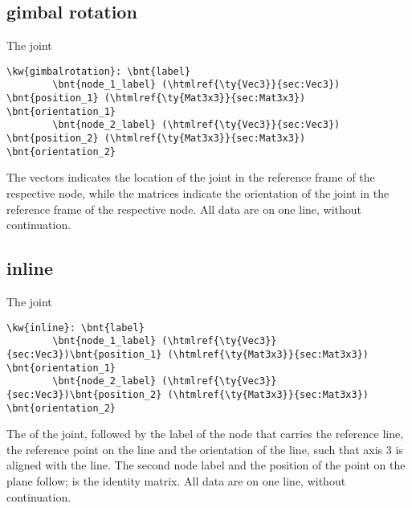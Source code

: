 \subsection{gimbal rotation}
The  joint
\begin{Verbatim}[commandchars=\\\{\}]
    \kw{gimbalrotation}: \bnt{label}
        \bnt{node_1_label} (\htmlref{\ty{Vec3}}{sec:Vec3}) \bnt{position_1} (\htmlref{\ty{Mat3x3}}{sec:Mat3x3}) \bnt{orientation_1}
        \bnt{node_2_label} (\htmlref{\ty{Vec3}}{sec:Vec3}) \bnt{position_2} (\htmlref{\ty{Mat3x3}}{sec:Mat3x3}) \bnt{orientation_2}
\end{Verbatim}
The  vectors indicates the location of the joint
in the reference frame of the respective node,
while the  matrices indicate the orientation of the joint
in the reference frame of the respective node.
All data are on one line, without continuation.

\subsection{inline}
The  joint
\begin{Verbatim}[commandchars=\\\{\}]
    \kw{inline}: \bnt{label}
        \bnt{node_1_label} (\htmlref{\ty{Vec3}}{sec:Vec3})\bnt{position_1} (\htmlref{\ty{Mat3x3}}{sec:Mat3x3}) \bnt{orientation_1}
        \bnt{node_2_label} (\htmlref{\ty{Vec3}}{sec:Vec3})\bnt{position_2} (\htmlref{\ty{Mat3x3}}{sec:Mat3x3}) \bnt{orientation_2}
\end{Verbatim}
The  of the joint, followed by the label of the node
that carries the reference line, the reference point 
on the line and the orientation  of the line,
such that axis 3 is aligned with the line.
The second node label and the position of the point on the plane
follow;  is the identity matrix.
All data are on one line, without continuation.

